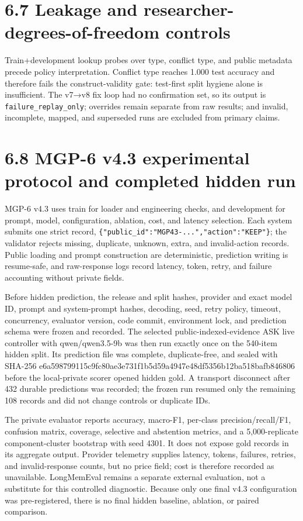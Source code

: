 \section{6.7 Leakage and researcher-degrees-of-freedom
controls}\label{leakage-and-researcher-degrees-of-freedom-controls}

Train+development lookup probes over type, conflict type, and public
metadata precede policy interpretation. Conflict type reaches 1.000 test
accuracy and therefore fails the construct-validity gate: test-first
split hygiene alone is insufficient. The v7→v8 fix loop had no
confirmation set, so its output is \texttt{failure\_replay\_only};
overrides remain separate from raw results; and invalid, incomplete,
mapped, and superseded runs are excluded from primary claims.

\section{6.8 MGP-6 v4.3 experimental protocol and completed hidden
run}\label{mgp-6-v4.3-experimental-protocol-and-completed-hidden-run}

MGP-6 v4.3 uses train for loader and engineering checks, and development
for prompt, model, configuration, ablation, cost, and latency selection.
Each system submits one strict record,
\texttt{\{"public\_id":"MGP43-...","action":"KEEP"\}}; the validator
rejects missing, duplicate, unknown, extra, and invalid-action records.
Public loading and prompt construction are deterministic, prediction
writing is resume-safe, and raw-response logs record latency, token,
retry, and failure accounting without private fields.

Before hidden prediction, the release and split hashes, provider and
exact model ID, prompt and system-prompt hashes, decoding, seed, retry
policy, timeout, concurrency, evaluator version, code commit,
environment lock, and prediction schema were frozen and recorded. The
selected public-indexed-evidence ASK live controller with
qwen/qwen3.5-9b was then run exactly once on the 540-item hidden split.
Its prediction file was complete, duplicate-free, and sealed with
SHA-256 e6a598799115c9fc80ae3e731f1b5d59a4947e48df5356b12ba518bafb846806
before the local-private scorer opened hidden gold. A transport
disconnect after 432 durable predictions was recorded; the frozen run
resumed only the remaining 108 records and did not change controls or
duplicate IDs.

The private evaluator reports accuracy, macro-F1, per-class
precision/recall/F1, confusion matrix, coverage, selective and
abstention metrics, and a 5,000-replicate component-cluster bootstrap
with seed 4301. It does not expose gold records in its aggregate output.
Provider telemetry supplies latency, tokens, failures, retries, and
invalid-response counts, but no price field; cost is therefore recorded
as unavailable. LongMemEval remains a separate external evaluation, not
a substitute for this controlled diagnostic. Because only one final v4.3
configuration was pre-registered, there is no final hidden baseline,
ablation, or paired comparison.


